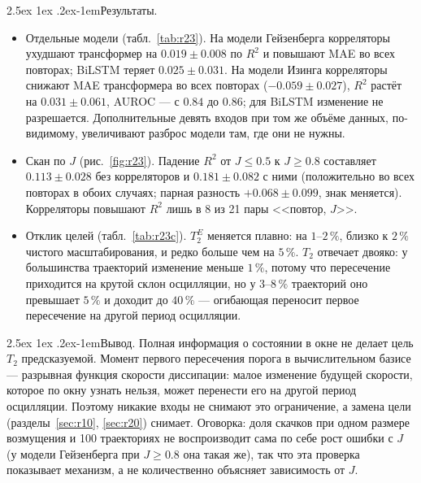 \documentclass[12pt,a4paper]{report}
\makeatletter
\renewcommand\paragraph{\@startsection{paragraph}{4}{\z@}%
  {2.5ex \@plus1ex \@minus.2ex}{-1em}{\normalfont\normalsize\bfseries}}
\numberwithin{equation}{chapter}
\makeatother
\begin{document}
\paragraph{Результаты.}
\begin{itemize}
\item Отдельные модели (табл.~\ref{tab:r23}). На модели Гейзенберга
      корреляторы ухудшают трансформер на $0.019\pm0.008$ по $R^2$ и
      повышают MAE во всех повторах; BiLSTM теряет $0.025\pm0.031$. На
      модели Изинга корреляторы снижают MAE трансформера во всех повторах
      ($-0.059\pm0.027$), $R^2$ растёт на $0.031\pm0.061$, AUROC --- с $0.84$ до
      $0.86$; для BiLSTM изменение не разрешается. Дополнительные девять
      входов при том же объёме данных, по-видимому, увеличивают разброс
      модели там, где они не нужны.
\item Скан по $J$ (рис.~\ref{fig:r23}). Падение $R^2$ от $J\le0.5$ к $J\ge0.8$
      составляет $0.113\pm0.028$ без корреляторов и $0.181\pm0.082$ с ними
      (положительно во всех повторах в обоих случаях; парная разность
      $+0.068\pm0.099$, знак меняется). Корреляторы повышают $R^2$ лишь в 8
      из 21 пары <<повтор, $J$>>.
\item Отклик целей (табл.~\ref{tab:r23c}). $T_2^E$ меняется плавно: на
      $1$--$2\,\%$, близко к $2\,\%$ чистого масштабирования, и редко больше
      чем на $5\,\%$. $T_2$ отвечает двояко: у большинства траекторий
      изменение меньше $1\,\%$, потому что пересечение приходится на крутой
      склон осцилляции, но у $3$--$8\,\%$ траекторий оно превышает $5\,\%$ и
      доходит до $40\,\%$ --- огибающая переносит первое пересечение на
      другой период осцилляции.
\end{itemize}

\paragraph{Вывод.} Полная информация о состоянии в окне не делает цель $T_2$
предсказуемой. Момент первого пересечения порога в вычислительном базисе
--- разрывная функция скорости диссипации: малое изменение будущей
скорости, которое по окну узнать нельзя, может перенести его на другой
период осцилляции. Поэтому никакие входы не снимают это ограничение, а
замена цели (разделы~\ref{sec:r10}, \ref{sec:r20}) снимает. Оговорка: доля
скачков при одном размере возмущения и 100 траекториях не воспроизводит
сама по себе рост ошибки с $J$ (у модели Гейзенберга при $J\ge0.8$ она
такая же), так что эта проверка показывает механизм, а не количественно
объясняет зависимость от $J$.
\end{document}
